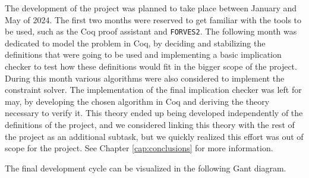 The development of the project was planned to take place between January and May of 2024.
The first two months were reserved to get familiar with the tools to be used, such as the
Coq proof assistant and \verb|FORVES2|. The following month was dedicated to model the
problem in Coq, by deciding and stabilizing the definitions that were going to be used and
implementing a basic implication checker to test how these definitions would fit in the
bigger scope of the project. During this month various algorithms were also considered to
implement the constraint solver. The implementation of the final implication checker was
left for may, by developing the chosen algorithm in Coq and deriving the theory necessary
to verify it. This theory ended up being developed independently of the definitions of the
project, and we considered linking this theory with the rest of the project as an 
additional subtask, but we quickly realized this effort was out of scope for the project.
See Chapter \ref{cap:conclusions} for more information.

The final development cycle can be visualized in the following Gant diagram.

